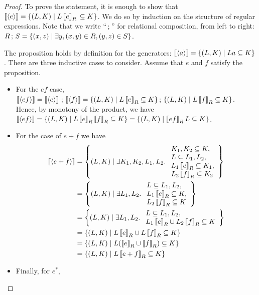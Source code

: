 \documentclass{lmcs}
\theoremstyle{plain}\newtheorem{satz}[thm]{Satz} %
\begin{document}
\begin{proof}
To prove the statement, it is enough to show that
 $\left\llbracket{\left\langle{e}\right\rangle}\right\rrbracket = \left\{(L,K)\mid L \left\llbracket{e}\right\rrbracket_R \,  \subseteq K\right\}$.
We do so by induction on the structure of regular expressions. Note that we write ``$\,;\,$'' for relational composition, from left to right: $R\,;\, S = \{(x,z)\mid \exists y, (x,y)\in R, (y,z)\in S\}$.

The proposition holds by definition for the generators: $\left\llbracket{\left\langle{a}\right\rangle}\right\rrbracket = \{(L,K)\mid La\subseteq K\}$. There are three inductive cases to consider. Assume that $e$ and $f$ satisfy the proposition.
\begin{itemize}
\item For the $ef$ case, $\left\llbracket{\left\langle{ef}\right\rangle}\right\rrbracket = \left\llbracket{\left\langle{e}\right\rangle}\right\rrbracket\,;\, \left\llbracket{\left\langle{f}\right\rangle}\right\rrbracket = \{(L,K)\mid L\left\llbracket{e}\right\rrbracket_R\subseteq K\}\,;\, \{(L,K)\mid L\left\llbracket{f}\right\rrbracket_R\subseteq K\}$. Hence, by monotony of the product, we have $\left\llbracket{\left\langle{ef}\right\rangle}\right\rrbracket =\{(L,K)\mid L\left\llbracket{e}\right\rrbracket_R\left\llbracket{f}\right\rrbracket_R\subseteq K\} = \{(L,K)\mid \left\llbracket{ef}\right\rrbracket_RL\subseteq K\}$.
\item For the case of $e+f$ we have \begin{align*}
\left\llbracket{\left\langle{e+f}\right\rangle}\right\rrbracket &= \left\{(L,K)\mid \exists K_1, K_2, L_1, L_2.\;\begin{array}{l} K_1, K_2\subseteq K, \\
L\subseteq L_1, L_2,
\\L_1\left\llbracket{e}\right\rrbracket_R\subseteq K_1,
\\L_2\left\llbracket{f}\right\rrbracket_R\subseteq K_2\end{array}\right\}\\
&= \left\{(L,K)\mid \exists L_1, L_2.\; \begin{array}{l}L\subseteq L_1, L_2,
\\L_1\left\llbracket{e}\right\rrbracket_R\subseteq K,
\\L_2\left\llbracket{f}\right\rrbracket_R\subseteq K\end{array}\right\}\\
& = \left\{(L,K)\mid \exists L_1, L_2.\;\begin{array}{l} L\subseteq L_1, L_2,
\\ L_1\left\llbracket{e}\right\rrbracket_R \cup L_2\left\llbracket{f}\right\rrbracket_R \subseteq K\end{array}\right\}\\
&= \{(L,K)\mid L\left\llbracket{e}\right\rrbracket_R \cup L\left\llbracket{f}\right\rrbracket_R \subseteq K\} \\
&= \{(L,K)\mid L(\left\llbracket{e}\right\rrbracket_R\cup \left\llbracket{f}\right\rrbracket_R) \subseteq K\}\\
& =  \{(L,K)\mid L\left\llbracket{e+f}\right\rrbracket_R \subseteq K\}
\end{align*}
\item Finally, for $e^*$,

\end{itemize}
\end{proof}
\end{document}
